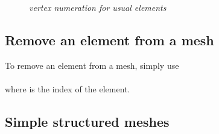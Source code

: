 \documentclass[11pt,a4paper]{article}
\begin{document}
\begin{figure}[htb]
  \begin{center}
  \end{center}
  \caption{ \it vertex numeration for usual elements }
  \label{fig:elem}
\end{figure}

\subsection{Remove an element from a mesh}
To remove an element from a mesh, simply use\\[0.5cm]
\\[0.5cm]
where  is the index of the element.

\subsection{Simple structured meshes}
\end{document}
